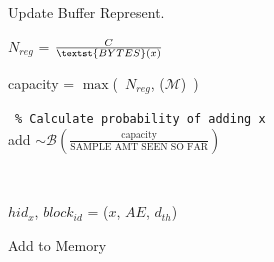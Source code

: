 \documentclass[colorinlistoftodos]{article} %
\begin{document}
\begin{minipage}{\textwidth}
\begin{minipage}{0.45\textwidth}
\begin{algorithm2e}[H]\small
\SetAlgoLined
  \DontPrintSemicolon
    

 \caption{Update Buffer Represent.}
\label{algo:vqr}
    
\end{algorithm2e}
\end{minipage}
\qquad
\begin{minipage}{0.5\textwidth}
\begin{algorithm2e}[H]\small
\SetAlgoLined
  \DontPrintSemicolon
    
    $N_{reg}$ = $\frac{C}{\textst{BYTES}(x)}$
    
    
    capacity = $\max$(\ $N_{reg}$, ($\mathcal{M}$)\ ) 
    
     \,\,\,\texttt{\% Calculate probability of adding x} \\
    add $\sim \mathcal{B}(\frac{\text{capacity}}{\text{SAMPLE AMT SEEN SO FAR}})$
    
    \,\,
    {
        $hid_x$, $block_{id}$ = ($x$, $AE$, $d_{th}$) \\
        
    }
    

 
 \caption{Add to Memory}
\label{algo:vqr}
\end{algorithm2e}
\end{minipage}
\end{minipage}
\end{document}
